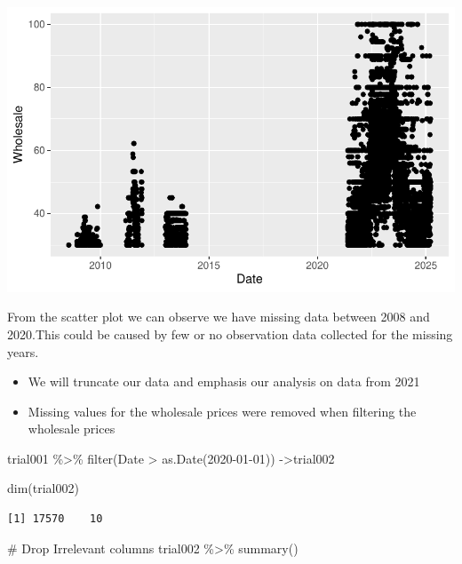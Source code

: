 \documentclass[
  letterpaper,
  DIV=11,
  numbers=noendperiod]{scrartcl}
\newenvironment{Shaded}{\begin{snugshade}}{\end{snugshade}}
\newcommand{\CommentTok}[1]{\textcolor[rgb]{0.37,0.37,0.37}{#1}}
\newcommand{\FunctionTok}[1]{\textcolor[rgb]{0.28,0.35,0.67}{#1}}
\newcommand{\NormalTok}[1]{\textcolor[rgb]{0.00,0.23,0.31}{#1}}
\newcommand{\OtherTok}[1]{\textcolor[rgb]{0.00,0.23,0.31}{#1}}
\newcommand{\SpecialCharTok}[1]{\textcolor[rgb]{0.37,0.37,0.37}{#1}}
\newcommand{\StringTok}[1]{\textcolor[rgb]{0.13,0.47,0.30}{#1}}
\begin{document}
\includegraphics{Maize_analysis_files/figure-pdf/unnamed-chunk-8-1.pdf}

From the scatter plot we can observe we have missing data between 2008
and 2020.This could be caused by few or no observation data collected
for the missing years.

\begin{itemize}
\item
  We will truncate our data and emphasis our analysis on data from 2021
\item
  Missing values for the wholesale prices were removed when filtering
  the wholesale prices
\end{itemize}

\begin{Shaded}
\begin{Highlighting}[]
\NormalTok{trial001 }\SpecialCharTok{\%\textgreater{}\%} \FunctionTok{filter}\NormalTok{(Date }\SpecialCharTok{\textgreater{}} \FunctionTok{as.Date}\NormalTok{(}\StringTok{\textquotesingle{}2020{-}01{-}01\textquotesingle{}}\NormalTok{)) }\OtherTok{{-}\textgreater{}}\NormalTok{trial002}

\FunctionTok{dim}\NormalTok{(trial002)}
\end{Highlighting}
\end{Shaded}

\begin{verbatim}
[1] 17570    10
\end{verbatim}

\begin{Shaded}
\begin{Highlighting}[]
\CommentTok{\# Drop Irrelevant columns}
\NormalTok{trial002 }\SpecialCharTok{\%\textgreater{}\%} \FunctionTok{summary}\NormalTok{()}
\end{Highlighting}
\end{Shaded}
\end{document}
